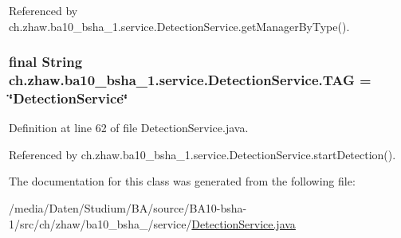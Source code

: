 Referenced by ch.zhaw.ba10\_\-bsha\_\-1.service.DetectionService.getManagerByType().\hypertarget{classch_1_1zhaw_1_1ba10__bsha__1_1_1service_1_1DetectionService_a94d1866b426bddfba5d001cc6bc003fa}{
\subsubsection[{TAG}]{\setlength{\rightskip}{0pt plus 5cm}final String {\bf ch.zhaw.ba10\_\-bsha\_\-1.service.DetectionService.TAG} = \char`\"{}DetectionService\char`\"{}}}
\label{classch_1_1zhaw_1_1ba10__bsha__1_1_1service_1_1DetectionService_a94d1866b426bddfba5d001cc6bc003fa}


Definition at line 62 of file DetectionService.java.

Referenced by ch.zhaw.ba10\_\-bsha\_\-1.service.DetectionService.startDetection().

The documentation for this class was generated from the following file:\begin{DoxyCompactItemize}
\item 
/media/Daten/Studium/BA/source/BA10-\/bsha-\/1/src/ch/zhaw/ba10\_\-bsha\_/service/\hyperlink{DetectionService_8java}{DetectionService.java}\end{DoxyCompactItemize}
